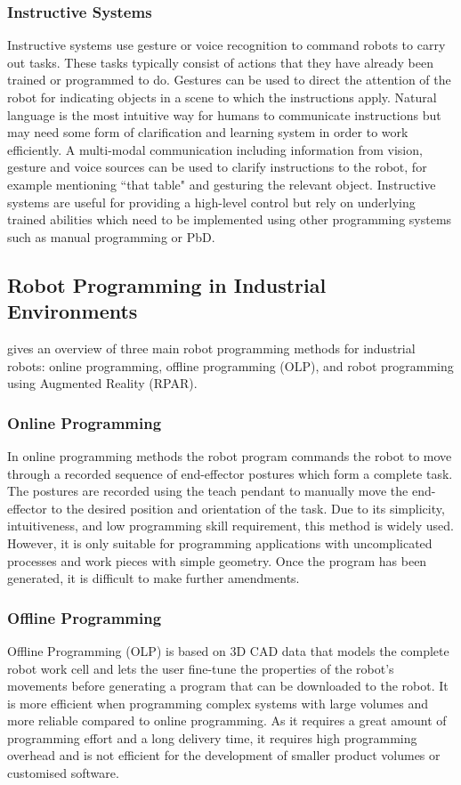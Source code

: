 \subsubsection{Instructive Systems}
Instructive systems use gesture or voice recognition to command robots to carry out tasks. These tasks typically consist of actions that they have already been trained or programmed to do. Gestures can be used to direct the attention of the robot for indicating objects in a scene to which the instructions apply. Natural language is the most intuitive way for humans to communicate instructions but may need some form of clarification and learning system in order to work efficiently. 
A multi-modal communication including information from vision, gesture and voice sources can be used to clarify instructions to the robot, for example mentioning ``that table" and gesturing the relevant object.
Instructive systems are useful for providing a high-level control but rely on underlying trained abilities which need to be implemented using other programming systems such as manual programming or PbD.

\subsection{Robot Programming in Industrial Environments}\label{subsec:RP in Industrial Enviroments}
\cite{pan2012recent} gives an overview of three main robot programming methods for industrial robots: online programming, offline programming (OLP), and robot programming using Augmented Reality (RPAR). 

\subsubsection{Online Programming}\label{sssec:Online Programming}
In online programming methods the robot program commands the robot to move through a recorded sequence of end-effector postures which form a complete task. The postures are recorded using the teach pendant to manually move the end-effector to the desired position and orientation of the task. Due to its simplicity, intuitiveness, and low programming skill requirement, this method is widely used. However, it is only suitable for programming applications with uncomplicated processes and work pieces with simple geometry. Once the program has been generated, it is difficult to make further amendments.

\subsubsection{Offline Programming}\label{sssec:Offline Programming}
Offline Programming (OLP) is based on 3D CAD data that models the complete robot work cell and lets the user fine-tune the properties of the robot's movements before generating a program that can be downloaded to the robot. It is more efficient when programming complex systems with large volumes and more reliable compared to online programming. As it requires a great amount of programming effort and a long delivery time, it requires high programming overhead and is not efficient for the development of smaller product volumes or customised software.

